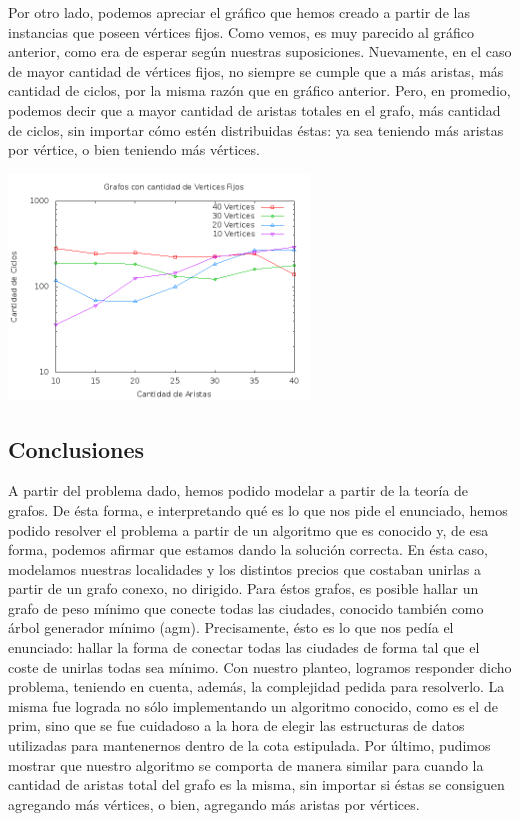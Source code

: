 Por otro lado, podemos apreciar el gráfico que hemos creado a partir de las instancias que poseen vértices fijos. Como vemos, es muy parecido al gráfico anterior, como era de esperar según nuestras suposiciones. Nuevamente, en el caso de mayor cantidad de vértices fijos, no siempre se cumple que a más aristas, más cantidad de ciclos, por la misma razón que en gráfico anterior. Pero, en promedio, podemos decir que a mayor cantidad de aristas totales en el grafo, más cantidad de ciclos, sin importar cómo estén distribuidas éstas: ya sea teniendo más aristas por vértice, o bien teniendo más vértices.
\begin {center}
\includegraphics[width=8cm]{./graficos/graficos_vertices_fijos.png}
\end {center} 


\subsection{Conclusiones}
A partir del problema dado, hemos podido modelar a partir de la teoría de grafos. De ésta forma, e interpretando qué es lo que nos pide el enunciado, hemos podido resolver el problema a partir de un algoritmo que es conocido y, de esa forma, podemos afirmar que estamos dando la solución correcta. 
En ésta caso, modelamos nuestras localidades y los distintos precios que costaban unirlas a partir de un grafo conexo, no dirigido. Para éstos grafos, es posible hallar un grafo de peso mínimo que conecte todas las ciudades, conocido también como árbol generador mínimo (agm). Precisamente, ésto es lo que nos pedía el enunciado: hallar la forma de conectar todas las ciudades de forma tal que el coste de unirlas todas sea mínimo. Con nuestro planteo, logramos responder dicho problema, teniendo en cuenta, además, la complejidad pedida para resolverlo. La misma fue lograda no sólo implementando un algoritmo conocido, como es el de prim, sino que se fue cuidadoso a la hora de elegir las estructuras de datos utilizadas para mantenernos dentro de la cota estipulada.
Por último, pudimos mostrar que nuestro algoritmo se comporta de manera similar para cuando la cantidad de aristas total del grafo es la misma, sin importar si éstas se consiguen agregando más vértices, o bien, agregando más aristas por vértices.

